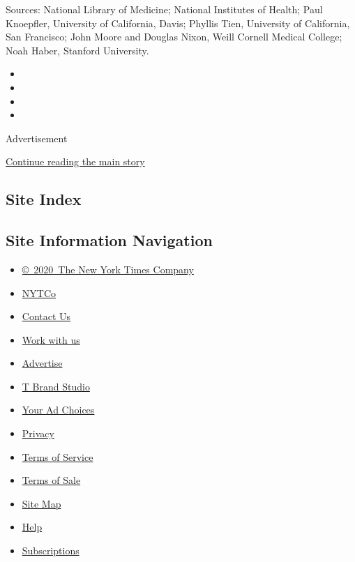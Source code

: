 Sources: National Library of Medicine; National Institutes of Health;
Paul Knoepfler, University of California, Davis; Phyllis Tien,
University of California, San Francisco; John Moore and Douglas Nixon,
Weill Cornell Medical College; Noah Haber, Stanford University.

\begin{itemize}
\item
\item
\item
\item
\end{itemize}

Advertisement

\protect\hyperlink{after-bottom}{Continue reading the main story}

\hypertarget{site-index}{%
\subsection{Site Index}\label{site-index}}

\hypertarget{site-information-navigation}{%
\subsection{Site Information
Navigation}\label{site-information-navigation}}

\begin{itemize}
\tightlist
\item
  \href{https://help.nytimes.com/hc/en-us/articles/115014792127-Copyright-notice}{©~2020~The
  New York Times Company}
\end{itemize}

\begin{itemize}
\tightlist
\item
  \href{https://www.nytco.com/}{NYTCo}
\item
  \href{https://help.nytimes.com/hc/en-us/articles/115015385887-Contact-Us}{Contact
  Us}
\item
  \href{https://www.nytco.com/careers/}{Work with us}
\item
  \href{https://nytmediakit.com/}{Advertise}
\item
  \href{http://www.tbrandstudio.com/}{T Brand Studio}
\item
  \href{https://www.nytimes.com/privacy/cookie-policy\#how-do-i-manage-trackers}{Your
  Ad Choices}
\item
  \href{https://www.nytimes.com/privacy}{Privacy}
\item
  \href{https://help.nytimes.com/hc/en-us/articles/115014893428-Terms-of-service}{Terms
  of Service}
\item
  \href{https://help.nytimes.com/hc/en-us/articles/115014893968-Terms-of-sale}{Terms
  of Sale}
\item
  \href{https://spiderbites.nytimes.com}{Site Map}
\item
  \href{https://help.nytimes.com/hc/en-us}{Help}
\item
  \href{https://www.nytimes.com/subscription?campaignId=37WXW}{Subscriptions}
\end{itemize}

